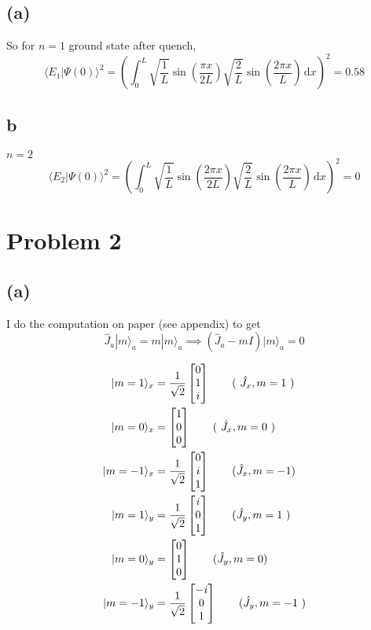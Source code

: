 \documentclass[letter]{article}
\begin{document}
\subsection*{(a)}
So for $n = 1$ ground state after quench, 
\[
	\langle E_1 | \Psi(0 ) \rangle ^2= 
	\left(
\int_{0}^{L} \sqrt{\frac{1}{L}} \sin \left(\frac{ \pi x}{2L}\right) \sqrt{\frac{2}{L}} \sin \left(\frac{2 \pi x}{L}\right) \, \mathrm{d} x 
	\right) ^2 = 0.58 
	\] 
	\subsection*{b}
$n = 2$ \[
	\langle E_2 | \Psi(0 ) \rangle ^2= 
	\left(
\int_{0}^{L} \sqrt{\frac{1}{L}} \sin \left(\frac{2 \pi x}{2L}\right) \sqrt{\frac{2}{L}} \sin \left(\frac{2 \pi x}{L}\right) \, \mathrm{d} x 
	\right) ^2 = 0
	\] 
\section*{Problem 2}
\subsection*{(a)} 
I do the computation on paper (see appendix) to get 
\[
\hat{J}_a | m \rangle _a = m | m \rangle _a \implies (\hat{J}_a - m I) | m \rangle _a  = 0
\] 

\begin{align*}
	| m = 1 \rangle _x &= \frac{1}{\sqrt{2} } \begin{bmatrix} 0\\1\\i \end{bmatrix}  
	\tag{
	$\hat{J}_x, m=1$  }
	\\
	| m = 0 \rangle _ x &= \begin{bmatrix} 1\\0\\0 \end{bmatrix}  
	\tag{
	$\hat{J} _x , m = 0$ }  
	\\
	| m = -1 \rangle _x &= \frac{1}{\sqrt{2} }\begin{bmatrix} 0\\i\\1 \end{bmatrix} 
	\tag{$\hat J _x , m = -1$} 
	\\
	| m = 1 \rangle _y &= \frac{1}{\sqrt{2} } \begin{bmatrix} i \\ 0 \\ 1 \end{bmatrix} 	
	\tag{$\hat{J} _ y , m = 1$ }
	\\
	| m = 0 \rangle_y &= \begin{bmatrix} 0\\1\\0 \end{bmatrix} 
	\tag{$\hat{J}_y, m = 0$} \\ 
	| m = -1 \rangle _y &= \frac{1}{\sqrt{2} } \begin{bmatrix} -i \\ 0 \\ 1 \end{bmatrix}  
	\tag{$\hat{J} _ y , m = -1 $ } 
\end{align*}
\end{document}
